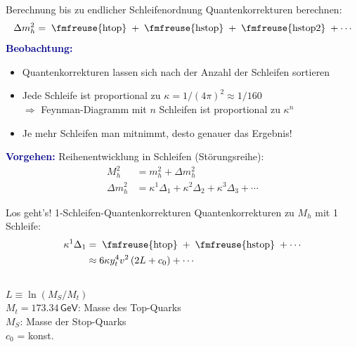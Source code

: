 \documentclass[hyperref={pdfpagelabels=false},ngerman]{beamer}
\newcommand{\fmfvcenter}[1]{\;\vcenter{\hbox{\fmfreuse{#1}}}\;}
\newcommand{\eh}[1]{\,\mathsf{#1}}
\newcommand{\MS}{\ensuremath{M_S}}
\renewcommand{\emph}[1]{\textbf{\textcolor{darkblue}{#1}}}
\newcommand{\GeV}{\eh{GeV}}
\begin{document}
\begin{frame}{Berechnung bis zu endlicher Schleifenordnung}
  Quantenkorrekturen berechnen:
  \begin{align*}
    \Delta m_h^2 = \fmfvcenter{htop} + \fmfvcenter{hstop} + \fmfvcenter{hstop2} + \cdots
  \end{align*}
  \emph{Beobachtung:}
  \begin{itemize}
  \item Quantenkorrekturen lassen sich nach der Anzahl der Schleifen
    sortieren
  \item Jede Schleife ist proportional zu $\kappa = 1/(4\pi)^2 \approx 1/160$\\
    $\Rightarrow$ Feynman-Diagramm mit $n$ Schleifen ist proportional zu $\kappa^n$
  \item Je mehr Schleifen man mitnimmt, desto genauer das Ergebnis!
  \end{itemize}
  \vspace*{1em}
  \emph{Vorgehen:}
  Reihenentwicklung in Schleifen (Störungsreihe):
  \begin{align*}
    M_h^2 &= m_h^2 + \Delta m_h^2 \\
    \Delta m_h^2 &= \kappa^1 \Delta_1 + \kappa^2 \Delta_2 + \kappa^3 \Delta_3 + \cdots
  \end{align*}
\end{frame}

\begin{frame}{Los geht's! 1-Schleifen-Quantenkorrekturen}
  Quantenkorrekturen zu $M_h$ mit 1 Schleife:
  \begin{align*}
    \kappa^1\Delta_1
    &= \fmfvcenter{htop} + \fmfvcenter{hstop} + \cdots \\
    &\approx 6 \kappa y_t^4 v^2 \left(
      2L + c_0
    \right) + \cdots
  \end{align*}
  \\[1em]
  $L\equiv\ln(\MS / M_t)$ \\[0.5em]
  $M_t = 173.34\GeV$: Masse des Top-Quarks \\[0.5em]
  $\MS$: Masse der Stop-Quarks \\[0.5em]
  $c_0$ = konst.
\end{frame}
\end{document}
